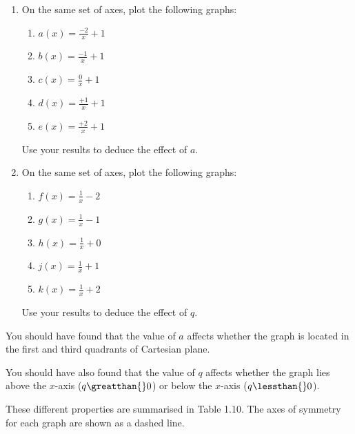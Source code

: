 \label{m39341*id246236}\begin{enumerate}[noitemsep, label=\textbf{\arabic*}. ] 
\label{m39341*uid139}\item On the same set of axes, plot the following graphs:
\label{m39341*id246252}\begin{enumerate}[noitemsep, label=\textbf{\alph*}. ] 
\label{m39341*uid140}\item $a\left(x\right)=\frac{-2}{x}+1$\label{m39341*uid141}\item $b\left(x\right)=\frac{-1}{x}+1$\label{m39341*uid142}\item $c\left(x\right)=\frac{0}{x}+1$\label{m39341*uid143}\item $d\left(x\right)=\frac{+1}{x}+1$\label{m39341*uid144}\item $e\left(x\right)=\frac{+2}{x}+1$\end{enumerate}
Use your results to deduce the effect of $a$.
\label{m39341*uid145}\item On the same set of axes, plot the following graphs:
\label{m39341*id246494}\begin{enumerate}[noitemsep, label=\textbf{\alph*}. ] 
\label{m39341*uid146}\item $f\left(x\right)=\frac{1}{x}-2$\label{m39341*uid147}\item $g\left(x\right)=\frac{1}{x}-1$\label{m39341*uid148}\item $h\left(x\right)=\frac{1}{x}+0$\label{m39341*uid149}\item $j\left(x\right)=\frac{1}{x}+1$\label{m39341*uid150}\item $k\left(x\right)=\frac{1}{x}+2$\end{enumerate}
Use your results to deduce the effect of $q$.
\end{enumerate}
\label{m39341*id246723}You should have found that the value of $a$ affects whether the graph is located in the first and third quadrants of Cartesian plane.\par 
\label{m39341*id246740}You should have also found that the value of $q$ affects whether the graph lies above the $x$-axis ($q\greatthan{}0$) or below the $x$-axis ($q\lessthan{}0$).\par 
\label{m39341*id246801}These different properties are summarised in Table 1.10. The axes of symmetry for each graph are shown as a dashed line.\par 
